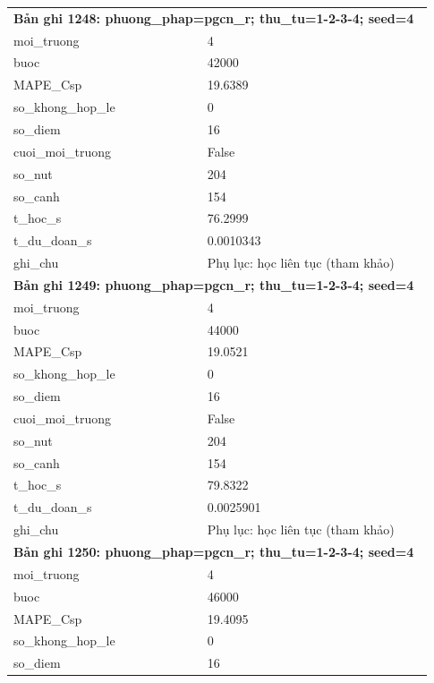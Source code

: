 \begin{longtable}{p{0.43\linewidth}p{0.50\linewidth}}
\midrule
\multicolumn{2}{p{0.95\linewidth}}{\textbf{Bản ghi 1248: phuong\_phap=pgcn\_r; thu\_tu=1-2-3-4; seed=4}} \\
moi\_\allowbreak truong & 4 \\
buoc & 42000 \\
MAPE\_\allowbreak Csp & 19.6389 \\
so\_\allowbreak khong\_\allowbreak hop\_\allowbreak le & 0 \\
so\_\allowbreak diem & 16 \\
cuoi\_\allowbreak moi\_\allowbreak truong & False \\
so\_\allowbreak nut & 204 \\
so\_\allowbreak canh & 154 \\
t\_\allowbreak hoc\_\allowbreak s & 76.2999 \\
t\_\allowbreak du\_\allowbreak doan\_\allowbreak s & 0.0010343 \\
ghi\_\allowbreak chu & Phụ lục: học liên tục (tham khảo) \\
\midrule
\multicolumn{2}{p{0.95\linewidth}}{\textbf{Bản ghi 1249: phuong\_phap=pgcn\_r; thu\_tu=1-2-3-4; seed=4}} \\
moi\_\allowbreak truong & 4 \\
buoc & 44000 \\
MAPE\_\allowbreak Csp & 19.0521 \\
so\_\allowbreak khong\_\allowbreak hop\_\allowbreak le & 0 \\
so\_\allowbreak diem & 16 \\
cuoi\_\allowbreak moi\_\allowbreak truong & False \\
so\_\allowbreak nut & 204 \\
so\_\allowbreak canh & 154 \\
t\_\allowbreak hoc\_\allowbreak s & 79.8322 \\
t\_\allowbreak du\_\allowbreak doan\_\allowbreak s & 0.0025901 \\
ghi\_\allowbreak chu & Phụ lục: học liên tục (tham khảo) \\
\midrule
\multicolumn{2}{p{0.95\linewidth}}{\textbf{Bản ghi 1250: phuong\_phap=pgcn\_r; thu\_tu=1-2-3-4; seed=4}} \\
moi\_\allowbreak truong & 4 \\
buoc & 46000 \\
MAPE\_\allowbreak Csp & 19.4095 \\
so\_\allowbreak khong\_\allowbreak hop\_\allowbreak le & 0 \\
so\_\allowbreak diem & 16 \\

\end{longtable}
